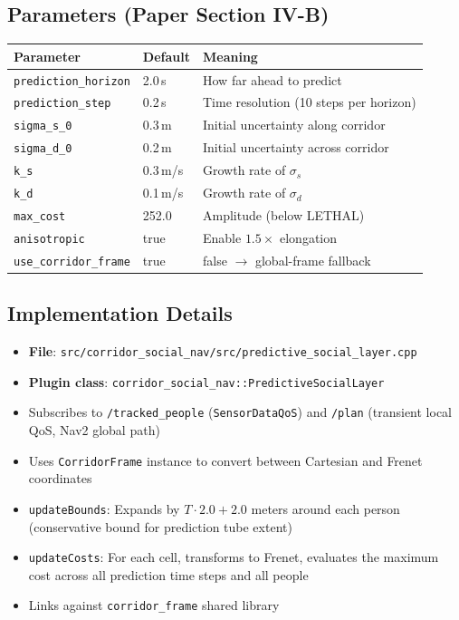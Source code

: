 \documentclass[11pt]{article}
\newcommand{\logentry}[1]{\subsection*{#1}}
\begin{document}
\logentry{Parameters (Paper Section IV-B)}
\begin{center}
\begin{tabular}{llp{7cm}}
\textbf{Parameter} & \textbf{Default} & \textbf{Meaning} \\
\hline
\texttt{prediction\_horizon} & 2.0\,s & How far ahead to predict \\
\texttt{prediction\_step} & 0.2\,s & Time resolution (10 steps per horizon) \\
\texttt{sigma\_s\_0} & 0.3\,m & Initial uncertainty along corridor \\
\texttt{sigma\_d\_0} & 0.2\,m & Initial uncertainty across corridor \\
\texttt{k\_s} & 0.3\,m/s & Growth rate of $\sigma_s$ \\
\texttt{k\_d} & 0.1\,m/s & Growth rate of $\sigma_d$ \\
\texttt{max\_cost} & 252.0 & Amplitude (below LETHAL) \\
\texttt{anisotropic} & true & Enable $1.5\times$ elongation \\
\texttt{use\_corridor\_frame} & true & false $\to$ global-frame fallback \\
\end{tabular}
\end{center}

\logentry{Implementation Details}
\begin{itemize}
  \item \textbf{File}: \texttt{src/corridor\_social\_nav/src/predictive\_social\_layer.cpp}
  \item \textbf{Plugin class}: \texttt{corridor\_social\_nav::PredictiveSocialLayer}
  \item Subscribes to \texttt{/tracked\_people} (\texttt{SensorDataQoS}) and
    \texttt{/plan} (transient local QoS, Nav2 global path)
  \item Uses \texttt{CorridorFrame} instance to convert between Cartesian and
    Frenet coordinates
  \item \texttt{updateBounds}: Expands by $T \cdot 2.0 + 2.0$ meters around
    each person (conservative bound for prediction tube extent)
  \item \texttt{updateCosts}: For each cell, transforms to Frenet, evaluates
    the maximum cost across all prediction time steps and all people
  \item Links against \texttt{corridor\_frame} shared library
\end{itemize}
\end{document}
